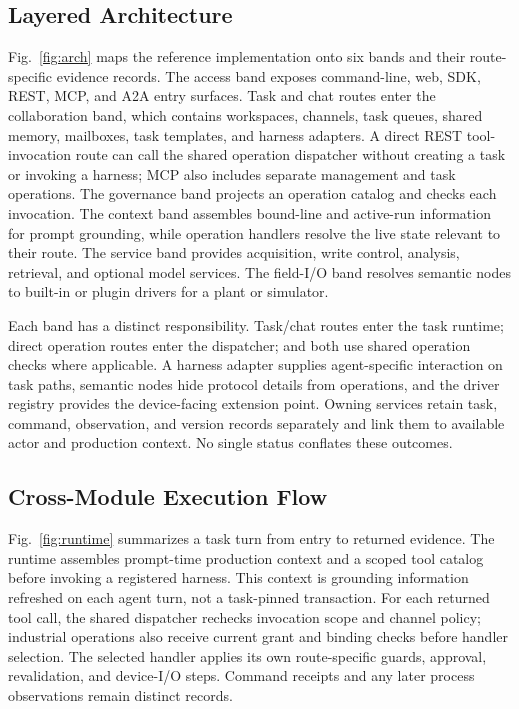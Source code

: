 \subsection{Layered Architecture}
\label{sec:layers}
\label{sec:arch}
Fig.~\ref{fig:arch} maps the reference implementation onto six bands and
their route-specific evidence records. The access band exposes command-line,
web, SDK, REST, MCP, and A2A entry surfaces. Task and chat routes enter the
collaboration band, which contains workspaces, channels, task queues, shared
memory, mailboxes, task templates, and harness adapters. A direct REST
tool-invocation route can call the shared operation dispatcher without
creating a task or invoking a harness; MCP also includes separate management
and task operations. The governance band projects an operation catalog and
checks each invocation. The context band assembles bound-line and active-run
information for prompt grounding, while operation handlers resolve the live
state relevant to their route. The service band provides acquisition, write
control, analysis, retrieval, and optional model services. The field-I/O band
resolves semantic nodes to built-in or plugin drivers for a plant or
simulator.

Each band has a distinct responsibility. Task/chat routes enter the task
runtime; direct operation routes enter the dispatcher; and both use shared
operation checks where applicable. A harness adapter supplies
agent-specific interaction on task paths, semantic nodes hide protocol
details from operations, and the driver registry provides the device-facing
extension point. Owning services retain task, command, observation, and
version records separately and link them to available actor and production
context. No single status conflates these outcomes.

\subsection{Cross-Module Execution Flow}
\label{sec:executionflow}
Fig.~\ref{fig:runtime} summarizes a task turn from entry to returned
evidence. The runtime assembles prompt-time production context and a scoped
tool catalog before invoking a registered harness. This context is grounding
information refreshed on each agent turn, not a task-pinned transaction. For
each returned tool call, the shared dispatcher rechecks invocation scope
and channel policy; industrial operations also receive current grant and
binding checks before handler selection. The selected handler applies its
own route-specific guards, approval, revalidation, and device-I/O steps.
Command receipts and any later process observations remain distinct records.


